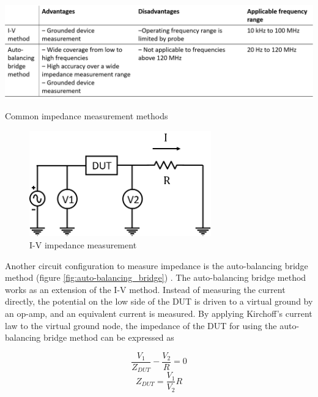  \begin{table}[ht]
    \centering
    \includegraphics[width=\textwidth]{images/impedanceMeasurementMethods.png}
    \caption[Common impedance measurement methods]{Common impedance measurement methods \cite{keysight_technologies_impedance_2015}}
    \label{tab:z_measurement_methods}
 \end{table}
 
 \begin{figure}[ht]
    \centering
    \includegraphics[width=0.7\textwidth]{images/I-VMethod.png}
    \caption[I-V impedance measurement configuration]{I-V impedance measurement }
    \label{fig:IV_impedance_measurement}
\end{figure}

\par Another circuit configuration to measure impedance is the auto-balancing bridge method (figure \ref{fig:auto-balancing_bridge}) \cite{keysight_technologies_impedance_2015}. The auto-balancing bridge method works as an extension of the I-V method. Instead of measuring the current directly, the potential on the low side of the DUT is driven to a virtual ground by an op-amp, and an equivalent current is measured. By applying Kirchoff's current law to the virtual ground node, the impedance of the DUT for using the auto-balancing bridge method can be expressed as

\begin{equation}
    \frac{V_1}{Z_{DUT}} - \frac{V_2}{R} = 0
\end{equation}
\begin{equation}
    Z_{DUT} = \frac{V_1}{V_2}R
\end{equation}

